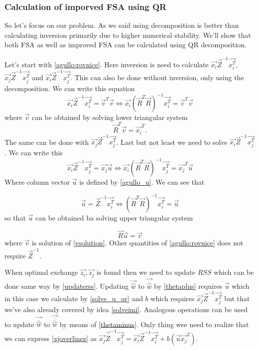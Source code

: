 \subsubsection{Calculation of imporved FSA using QR}
So let's focus on our problem. As we said using decomposition is better than calculating inversion primarily due to higher numerical stability. 
We'll show that both FSA as well as improved FSA can be calculated using QR decomposition.

Let's start with \ref{agullo:rovnice}. Here inversion is need to calculate 
$\vec{x_i}\vec{Z}^{-1}\vec{x_i^T}$, $\vec{x_j}\vec{Z}^{-1}\vec{x_j^T}$ and $\vec{x_i}\vec{Z}^{-1}\vec{x_j^T}$. This can also be done without inversion, only using the decomposition. We can write this equation
\begin{equation} \label{solveimi}
	\vec{x_i}\vec{Z}^{-1}\vec{x_i^T} = \vec{v}^T\vec{v} 	\iff \vec{x_i}(\vec{R}^T\vec{R})^{-1}\vec{x_i^T} = \vec{v}^T\vec{v}
\end{equation} 
where $\vec{v}$ can be obtained by solving lower triangular system
\begin{equation} \label{vsolution}
	\vec{R}^T\vec{v} = \vec{x_i}^T.
\end{equation} 
The same can be done with  $\vec{x_j}\vec{Z}^{-1}\vec{x_j^T}$. Last but not least we need to solve 
$\vec{x_i}\vec{Z}^{-1}\vec{x_j^T}$. We can write this 
\begin{equation}
	\vec{x_i}\vec{Z}^{-1}\vec{x_j^T} = \vec{x_j}\vec{u} 	\iff \vec{x_i}(\vec{R}^T\vec{R})^{-1}\vec{x_j^T} = \vec{x_j}^T\vec{u}
\end{equation} 
Where column vector $\vec{u}$ is defined by \ref{agullo_u}. We can see that 

\begin{equation}
	\vec{u} = \vec{Z}^{-1}\vec{x_i^T} 	\iff (\vec{R}^T\vec{R})^{-1}\vec{x_i^T} = \vec{u}
\end{equation}
so that $\vec{u}$ can be obtained ba solving upper triangular system 

\begin{equation} \label{solve_u_qr}
	\vec{R}\vec{u} = \vec{v}
\end{equation}
where $\vec{v}$ is solution of \ref{vsolution}. Other quantities of \ref{agullo:rovnice} does not require $\vec{Z}^{-1}$.

When optimal exchange $\vec{z_i}, \vec{z_j}$ is found then we need to update $RSS$ which can be done same way by \ref{updaterss}. Updating $\vec{\hat{w}}$ to  $\vec{\overline{\hat{w}}}$ by \ref{thetaplus} requires
$\vec{u}$  which in this case we calculate by \ref{solve_u_qr} and $b$ which requires  $\vec{x_j}\vec{Z}^{-1}\vec{x_j^T}$ but that we've also already covered by idea \ref{solveimi}. Analogous operations can be used to update $\vec{\overline{\hat{w}}}$ to $\vec{\overline{\overline{\hat{w}}}}$  by means of \ref{thetaminus}. Only thing wee need to realize that we can express \ref{xjoverlinez} as $\vec{x_j}\vec{\overline{{Z}}}^{-1}\vec{x_j^T} = \vec{x_i}\vec{{{Z}}}^{-1}\vec{x_i^T} + b(\vec{u}\vec{x_j}^2)$.

